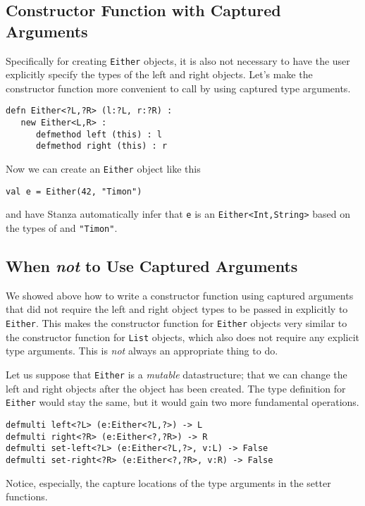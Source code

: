 \documentclass[10pt,oneside]{book}
\begin{document}
\subsection*{Constructor Function with Captured Arguments}
Specifically for creating \texttt{\frenchspacing Either} objects, it is also not necessary to have the user explicitly specify the types of the left and right objects. Let's make the constructor function more convenient to call by using captured type arguments.
\begin{lstlisting}
defn Either<?L,?R> (l:?L, r:?R) :
   new Either<L,R> :
      defmethod left (this) : l
      defmethod right (this) : r
\end{lstlisting}
Now we can create an \texttt{\frenchspacing Either} object like this
\begin{lstlisting}
val e = Either(42, "Timon")
\end{lstlisting}
and have Stanza automatically infer that \texttt{\frenchspacing e} is an \texttt{\frenchspacing Either<Int,String>} based on the types of \texttt{} and \texttt{\frenchspacing "Timon"}.

\subsection*{When {\em not} to Use Captured Arguments}
We showed above how to write a constructor function using captured arguments that did not require the left and right object types to be passed in explicitly to \texttt{\frenchspacing Either}. This makes the constructor function for \texttt{\frenchspacing Either} objects very similar to the constructor function for \texttt{\frenchspacing List} objects, which also does not require any explicit type arguments. This is {\em not} always an appropriate thing to do.

Let us suppose that \texttt{\frenchspacing Either} is a {\em mutable} datastructure; that we can change the left and right objects after the object has been created. The type definition for \texttt{\frenchspacing Either} would stay the same, but it would gain two more fundamental operations.
\begin{lstlisting}
defmulti left<?L> (e:Either<?L,?>) -> L
defmulti right<?R> (e:Either<?,?R>) -> R
defmulti set-left<?L> (e:Either<?L,?>, v:L) -> False
defmulti set-right<?R> (e:Either<?,?R>, v:R) -> False
\end{lstlisting}
Notice, especially, the capture locations of the type arguments in the setter functions. 
\end{document}
